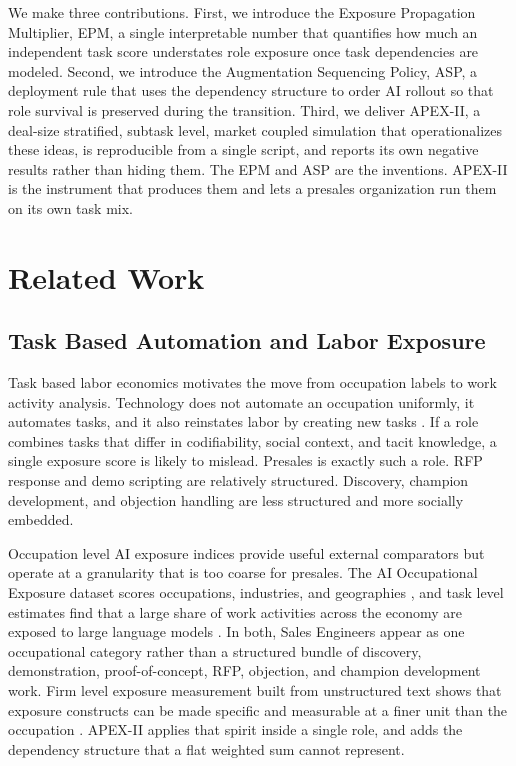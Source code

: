 \documentclass[10pt,conference]{IEEEtran}
\begin{document}
We make three contributions. First, we introduce the Exposure Propagation Multiplier, EPM, a single interpretable number that quantifies how much an independent task score understates role exposure once task dependencies are modeled. Second, we introduce the Augmentation Sequencing Policy, ASP, a deployment rule that uses the dependency structure to order AI rollout so that role survival is preserved during the transition. Third, we deliver APEX-II, a deal-size stratified, subtask level, market coupled simulation that operationalizes these ideas, is reproducible from a single script, and reports its own negative results rather than hiding them. The EPM and ASP are the inventions. APEX-II is the instrument that produces them and lets a presales organization run them on its own task mix.

\section{Related Work}
\subsection{Task Based Automation and Labor Exposure}
Task based labor economics motivates the move from occupation labels to work activity analysis. Technology does not automate an occupation uniformly, it automates tasks, and it also reinstates labor by creating new tasks \cite{acemoglu2019automation}. If a role combines tasks that differ in codifiability, social context, and tacit knowledge, a single exposure score is likely to mislead. Presales is exactly such a role. RFP response and demo scripting are relatively structured. Discovery, champion development, and objection handling are less structured and more socially embedded.

Occupation level AI exposure indices provide useful external comparators but operate at a granularity that is too coarse for presales. The AI Occupational Exposure dataset scores occupations, industries, and geographies \cite{felten2021occupational}, and task level estimates find that a large share of work activities across the economy are exposed to large language models \cite{eloundou2023gpts}. In both, Sales Engineers appear as one occupational category rather than a structured bundle of discovery, demonstration, proof-of-concept, RFP, objection, and champion development work. Firm level exposure measurement built from unstructured text shows that exposure constructs can be made specific and measurable at a finer unit than the occupation \cite{sautner2023firmlevel}. APEX-II applies that spirit inside a single role, and adds the dependency structure that a flat weighted sum cannot represent.
\end{document}
